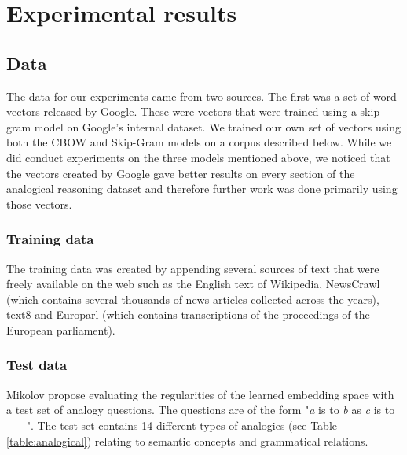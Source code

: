 
\section{Experimental results}

\subsection{Data}
The data for our experiments came from two sources. The first was a set of word vectors released by Google\cite{word2vec}. These were vectors that were trained using a skip-gram model on Google's internal dataset. We trained our own set of vectors using both the CBOW and Skip-Gram models on a corpus described below. While we did conduct experiments on the three models mentioned above, we noticed that the vectors created by Google gave better results on every section of the analogical reasoning dataset and therefore further work was done primarily using those vectors. 

\subsubsection{Training data}
The training data was created by appending several sources of text that were freely available on the web such as the English text of Wikipedia, NewsCrawl (which contains several thousands of news articles collected across the years), text8 and Europarl (which contains transcriptions of the proceedings of the European parliament).


\subsubsection{Test data}\label{sec:test_data}
Mikolov \etal \cite{mikolov3} propose evaluating the regularities of the learned embedding space with a test set of analogy questions. The questions are of the form "{\it a} is to {\it b} as {\it c} is to \_\_ ". The test set contains 14 different types of analogies (see Table \ref{table:analogical}) relating to semantic concepts and grammatical relations. 

